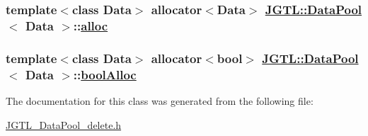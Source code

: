 \hypertarget{class_j_g_t_l_1_1_data_pool_659a9784d3dd8b8096d56f6e42403869}{
\subsubsection[alloc]{\setlength{\rightskip}{0pt plus 5cm}template$<$class Data$>$ allocator$<$Data$>$ \hyperlink{class_j_g_t_l_1_1_data_pool}{JGTL::Data\-Pool}$<$ Data $>$::\hyperlink{class_j_g_t_l_1_1_data_pool_659a9784d3dd8b8096d56f6e42403869}{alloc}}}
\label{class_j_g_t_l_1_1_data_pool_659a9784d3dd8b8096d56f6e42403869}


\hypertarget{class_j_g_t_l_1_1_data_pool_24aa967e3f726dc688a089ac3ee2d3e5}{
\subsubsection[boolAlloc]{\setlength{\rightskip}{0pt plus 5cm}template$<$class Data$>$ allocator$<$bool$>$ \hyperlink{class_j_g_t_l_1_1_data_pool}{JGTL::Data\-Pool}$<$ Data $>$::\hyperlink{class_j_g_t_l_1_1_data_pool_24aa967e3f726dc688a089ac3ee2d3e5}{bool\-Alloc}}}
\label{class_j_g_t_l_1_1_data_pool_24aa967e3f726dc688a089ac3ee2d3e5}




The documentation for this class was generated from the following file:\begin{CompactItemize}
\item 
\hyperlink{_j_g_t_l___data_pool__delete_8h}{JGTL\_\-Data\-Pool\_\-delete.h}\end{CompactItemize}
